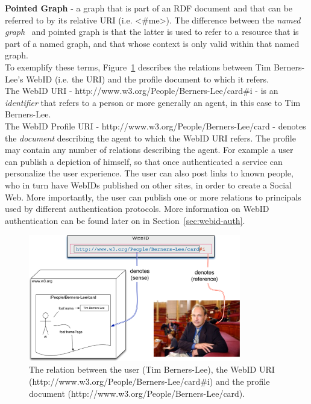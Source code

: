\textbf{Pointed Graph} - a graph that is part of an RDF document and that can be referred to by its relative URI (i.e. <\#me>). The difference between the \textit{named graph}~\cite{carroll2005named} and pointed graph is that the latter is used to refer to a resource that is part of a named graph, and that whose context is only valid within that named graph.\\

To exemplify these terms, Figure~\ref{fig:webid} describes the relations between Tim Berners-Lee's WebID (i.e. the URI) and the profile document to which it refers.\\

The WebID URI - http://www.w3.org/People/Berners-Lee/card\#i - is an \textit{identifier} that refers to a person or more generally an agent, in this case to Tim Berners-Lee.\\

The WebID Profile URI - http://www.w3.org/People/Berners-Lee/card - denotes the \textit{document} describing the agent to which the WebID URI refers. The profile may contain any number of relations describing the agent. For example a user can publish a depiction of himself, so that once authenticated a service can personalize the user experience. The user can also post links to known people, who in turn have WebIDs published on other sites, in order to create a Social Web. More importantly, the user can publish one or more relations to principals used by different authentication protocols. More information on WebID authentication can be found later on in Section~\ref{sec:webid-auth}.

\begin{figure}[htbp]
  \begin{center}
    \includegraphics[width=350px]{img/WebID-overview.png}
        \caption{The relation between the user (Tim Berners-Lee), the WebID URI (http://www.w3.org/People/Berners-Lee/card\#i) and the profile document (http://www.w3.org/People/Berners-Lee/card).}
        \label{fig:webid}
  \end{center}
\end{figure}

